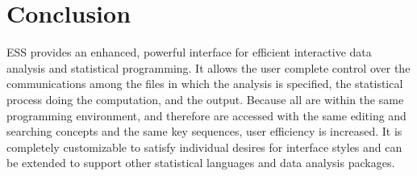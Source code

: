 \documentclass{article}
\newcommand*{\SAS}{\textsc{SAS}}
\begin{document}







\section{Conclusion}
\label{sec:concl}

ESS provides an enhanced, powerful interface for efficient interactive
data analysis and statistical programming.  It allows the user
complete control over the communications among the files in which the
analysis is specified, the statistical process doing the computation,
and the output.  Because all are within the same programming
environment, and therefore are accessed with the same editing and
searching concepts and the same key sequences, user efficiency is
increased.  It is completely customizable to satisfy individual
desires for interface styles and can be extended to support other
statistical languages and data analysis packages.
\end{document}
